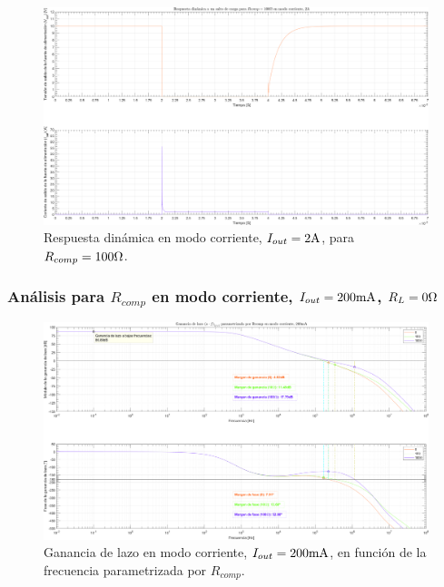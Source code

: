 \clearpage

\begin{figure}[H] %
\begin{center}
\includegraphics[width=1.1 \textwidth, angle=90]{./img/plots/dynamic/power_supply_RCOMP_100_STEP_Modo3.png}
\caption{\label{fig:fig_power_supply_RCOMP_STEP_100_Modo3}\footnotesize{Respuesta dinámica en modo corriente, $I_{out} = 2 \si[per-mode=symbol]{\ampere}$, para $R_{comp} = 100 \si[per-mode=symbol]{\ohm} $.}}
\end{center}
\end{figure}

\clearpage


\subsubsection{Análisis para $R_{comp}$ en modo corriente, $I_{out} = 200 \si[per-mode=symbol]{\milli\ampere}$, $R_{L} = 0 \si[per-mode=symbol]{\ohm}$}

\clearpage

\begin{figure}[H] %
\begin{center}
\includegraphics[width=1.1 \textwidth, angle=90]{./img/plots/loop/power_supply_RCOMP_LOOP_Modo4.png}
\caption{\label{fig:fig_power_supply_RCOMP_LOOP_Modo4}\footnotesize{Ganancia de lazo en modo corriente, $I_{out} = 200 \si[per-mode=symbol]{\milli\ampere}$, en función de la frecuencia parametrizada por $R_{comp}$.}}
\end{center}
\end{figure}


